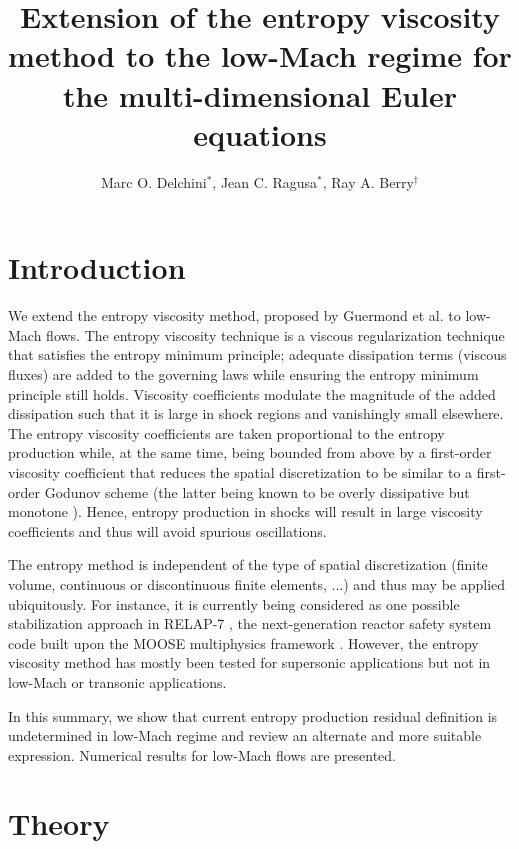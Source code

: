 \documentclass{anstrans}
\title{Extension of the entropy viscosity method to the low-Mach regime for the multi-dimensional Euler equations}
\author{Marc O. Delchini$^{*}$, Jean C. Ragusa$^{*}$, Ray A. Berry$^\dagger$}
\institute{
$^{*}$Department of Nuclear Engineering, Texas A\&M University, 
$^\dagger$Idaho National Laboratory
}
\begin{document}
\section{Introduction}

We extend the entropy viscosity method, proposed by Guermond et al. \cite{jlg1, jlg2}
to low-Mach flows. The entropy viscosity technique is a viscous regularization technique
that satisfies the entropy minimum principle; adequate dissipation terms (viscous fluxes)
are added to the governing laws while ensuring the entropy minimum principle still holds.
Viscosity coefficients modulate the magnitude of the added dissipation such that it is
large in shock regions and vanishingly small elsewhere. The entropy viscosity coefficients
are taken proportional to the entropy production while, at the same time, being bounded
from above by a first-order viscosity coefficient that reduces the spatial discretization
to be similar to a first-order Godunov scheme (the latter being known to be overly dissipative but
monotone \cite{toro}). Hence, entropy production in shocks will result in large viscosity  
coefficients and thus will avoid spurious oscillations. 

The entropy method is independent of the type of spatial discretization (finite volume,
continuous or discontinuous finite elements, ...) and thus may be applied ubiquitously. 
For instance, it is currently being considered as one possible stabilization approach in 
RELAP-7 \cite{Berry_2014}, the next-generation reactor safety system code built upon the MOOSE multiphysics framework
\cite{moose}. However, the entropy viscosity method has mostly been tested for supersonic applications but not in low-Mach 
or transonic applications.  

In this summary, we show that current entropy production residual definition is undetermined 
in low-Mach regime and review an alternate and more suitable expression. Numerical results for 
low-Mach flows are presented.

\section{Theory}
\end{document}
